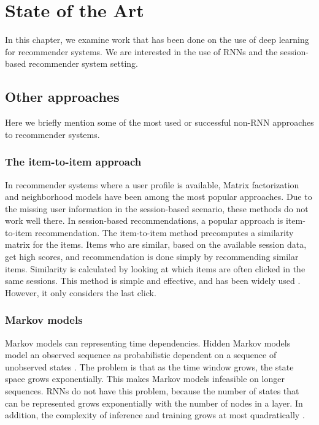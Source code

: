 \chapter{State of the Art}
\label{chp:sota}
In this chapter, we examine work that has been done on the use of deep learning for recommender systems. We are interested in the use of RNNs and the session-based recommender system setting.

\section{Other approaches}
Here we briefly mention some of the most used or successful non-RNN approaches to recommender systems.

\subsection{The item-to-item approach}
In recommender systems where a user profile is available, Matrix factorization and neighborhood models have been among the most popular approaches. Due to the missing user information in the session-based scenario, these methods do not work well there. In session-based recommendations, a popular approach is item-to-item recommendation. The item-to-item method precomputes a similarity matrix for the items. Items who are similar, based on the available session data, get high scores, and recommendation is done simply by recommending similar items. Similarity is calculated by looking at which items are often clicked in the same sessions. This method is simple and effective, and has been widely used \cite{DBLP:journals/corr/HidasiKBT15}. However, it only considers the last click.

\subsection{Markov models}
Markov models can representing time dependencies. Hidden Markov models model an observed sequence as probabilistic dependent on a sequence of unobserved states \cite{DBLP:journals/corr/Lipton15}. The problem is that as the time window grows, the state space grows exponentially. This makes Markov models infeasible on longer sequences. RNNs do not have this problem, because the number of states that can be represented grows exponentially with the number of nodes in a layer. In addition, the complexity of inference and training grows at most quadratically \cite{DBLP:journals/corr/Lipton15}.


